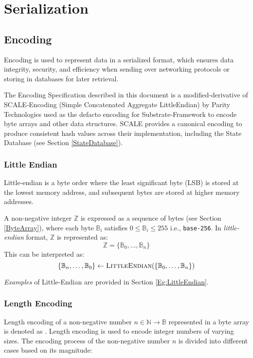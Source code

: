 \documentclass[../alan-handbook.tex]{subfiles}
\begin{document}
\section{Serialization}

\subsection{Encoding} 
\label{EncodingSpec}

Encoding is used to represent data in a serialized format, which ensures data integrity, security, and efficiency when sending over networking protocols or storing in databases for later retrieval.

The Encoding Specification described in this document is a modified-derivative of SCALE-Encoding (Simple Concatenated Aggregate LittleEndian) by Parity Technologies used as the defacto encoding for Substrate-Framework to encode byte arrays and other data structures. SCALE provides a canonical encoding to produce consistent hash values across their implementation, including the State Database (see Section \ref{StateDatabase}).

\subsubsection{Little Endian} 
\label{LittleEndian}

Little-endian is a byte order where the least significant byte (LSB) is stored at the lowest memory address, and subsequent bytes are stored at higher memory addresses.

A non-negative integer $\mathbb{Z}$ is expressed as a sequence of bytes (see Section \ref{ByteArray}), where each byte $\mathbb{B}_i$ satisfies $0 \leq \mathbb{B}_i \leq 255$ i.e., \texttt{base-256}. In \textit{little-endian} format, $\mathbb{Z}$ is represented as:
$$\mathbb{Z} = \{\mathbb{B}_0, \ldots, \mathbb{B}_n\}$$
This can be interpreted as:
$$\{\mathbb{B}_n, \ldots, \mathbb{B}_0\} \gets \Call{LittleEndian}{\{\mathbb{B}_0, \ldots, \mathbb{B}_n\}}$$

\textit{Examples} of Little-Endian are provided in Section \ref{Eg:LittleEndian}.

\subsubsection{Length Encoding} 
\label{LengthEncoding}

Length encoding of a non-negative number $n \in \mathbb{N} \to \mathbb{B}$ represented in a byte array is denoted as . Length encoding is used to encode integer numbers of varying sizes. The encoding process of the non-negative number $n$ is divided into different cases based on its magnitude:
\end{document}
